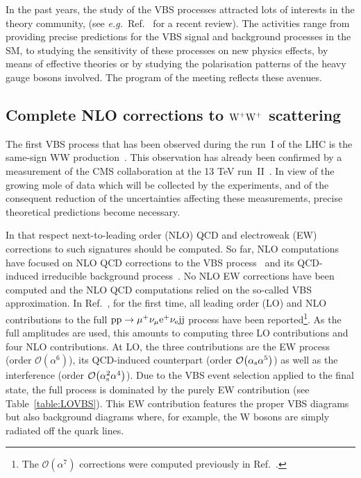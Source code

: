 In the past years, the study of the VBS processes attracted lots of interests in the theory community, (see \emph{e.g.}\ Ref.~\cite{Rauch:2016pai} for 
a recent review).
The activities range from providing precise predictions for the VBS signal and background processes in the SM, to studying the sensitivity of these 
processes on new physics effects, by means of effective theories or by studying the polarisation patterns of the heavy gauge bosons involved.
The program of the meeting reflects these avenues.

\subsection{Complete NLO corrections to ${\rm W^+ W^+}$ scattering}

The first VBS process that has been observed during the run~I of the LHC is the same-sign WW production~\cite{Aad:2014zda,Aaboud:2016ffv,Khachatryan:2014sta}.
This observation has already been confirmed by a measurement of the CMS collaboration at the 13 TeV run~II~\cite{CMS:2017adb}.
In view of the growing mole of data which will be collected by the experiments, and of the consequent reduction of the uncertainties affecting these measurements, precise theoretical predictions become necessary.

In that respect next-to-leading order (NLO) QCD and electroweak (EW) corrections to such signatures should be computed.
So far, NLO computations have focused on NLO QCD corrections to the VBS process~\cite{Jager:2009xx,Jager:2011ms,Denner:2012dz,Rauch:2016pai} and its QCD-induced irreducible background process~\cite{Melia:2010bm,Melia:2011gk,Campanario:2013gea,Baglio:2014uba,Rauch:2016pai}.
No NLO EW corrections have been computed and the NLO QCD computations relied on the so-called VBS approximation.
In Ref.~\cite{Biedermann:2017bss}, for the first time, all leading order (LO) and NLO contributions to the full ${\rm p}{\rm p}\to\mu^+\nu_\mu{\rm e}^+\nu_{\rm e}{\rm j}{\rm j}$ process have been reported\footnote{The $\mathcal{O}{\left(\alpha^{7}\right)}$ corrections
were computed previously in Ref.~\cite{Biedermann:2016yds}.}.
As the full amplitudes are used, this amounts to computing three LO contributions and four NLO contributions.
At LO, the three contributions are the EW process (order $\mathcal{O}{\left(\alpha^{6}\right)}$), its QCD-induced counterpart (order $\mathcal{O}{\left(\alpha_{\rm s}\alpha^{5}\right)}$) as well as the interference (order $\mathcal{O}{\left(\alpha_{\rm s}^2\alpha^{4}\right)}$).
Due to the VBS event selection applied to the final state, the full process is dominated by the purely EW contribution (see Table~\ref{table:LOVBS}).
This EW contribution features the proper VBS diagrams but also background diagrams where, for example, the W bosons are simply radiated off the quark lines.

